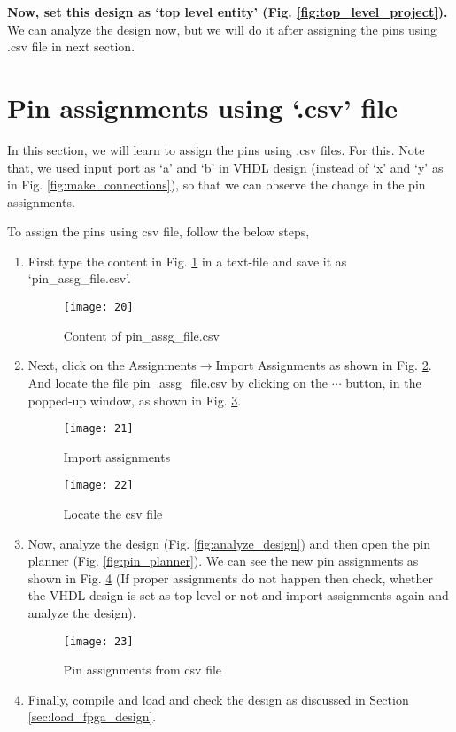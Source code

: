 \textbf{Now, set this design as `top level entity' (Fig. \ref{fig:top_level_project}).} We can analyze the design now, but we will do it after assigning the pins using .csv file in next section.



\section{Pin assignments using `.csv' file}
In this section, we will learn to assign the pins using .csv files. For this. Note that, we used input port as `a' and `b' in VHDL design (instead of `x' and `y' as in Fig. \ref{fig:make_connections}), so that we can observe the change in the pin assignments. 

To assign the pins using csv file, follow the below steps, 

\begin{enumerate}
	\item First type the content in Fig. \ref{fig:pin_ass_csv} in a text-file and save it as `pin\_assg\_file.csv'. 
	
	\begin{figure}[!h]
		\centering
		\texttt{[image: 20]}
		\caption{Content of pin\_assg\_file.csv}
		\label{fig:pin_ass_csv}
	\end{figure}
	
	\item Next, click on the Assignments$\rightarrow$Import Assignments as shown in Fig. \ref{fig:import_assg}. And locate the file pin\_assg\_file.csv by clicking on the $\cdots$ button, in the popped-up window, as shown in Fig. \ref{fig:locate_assg}. 
	
	\begin{figure}
		\centering
		\texttt{[image: 21]}
		\caption{Import assignments}
		\label{fig:import_assg}
	\end{figure}
	
	\begin{figure}[!h]
		\centering
		\texttt{[image: 22]}
		\caption{Locate the csv file}
		\label{fig:locate_assg}
	\end{figure}
	
	\item Now, analyze the design (Fig. \ref{fig:analyze_design}) and then open the pin planner (Fig. \ref{fig:pin_planner}). We can see the new pin assignments as shown in Fig. \ref{fig:pin_assg_from_csv} (If proper assignments do not happen then check, whether the VHDL design is set as top level or not and import assignments again and analyze the design). 
	
	\begin{figure}
		\centering
		\texttt{[image: 23]}
		\caption{Pin assignments from csv file}
		\label{fig:pin_assg_from_csv}
	\end{figure}
	
	\item Finally, compile and load and check the design as discussed in Section \ref{sec:load_fpga_design}. 
\end{enumerate}


